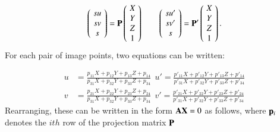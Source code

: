 \begin{equation}
\left(\!
    \begin{array}{c}
      su \\
      sv \\
      s
    \end{array}
  	\!\right) = \vect{P}
  	\left(\!
    \begin{array}{c}
      X \\
      Y \\
      Z \\
      1
    \end{array}
  	\!\right) 
  	\ \ \ \ \ \ \ \ 
\left(\!
    \begin{array}{c}
      su' \\
      sv' \\
      s
    \end{array}
  	\!\right) = \vect{P'}
  	\left(\!
    \begin{array}{c}
      X \\
      Y \\
      Z \\
      1
    \end{array}
  	\!\right).
\end{equation}
For each pair of image points, two equations can be written:

\begin{align*}
u &= \frac{p_{11}X + p_{12}Y + p_{13}Z + p_{14}}{p_{31}X + p_{32}Y + p_{33}Z + p_{34}} \ \  
u' = \frac{p'_{11}X + p'_{12}Y + p'_{13}Z + p'_{14}}{p'_{31}X + p'_{32}Y + p'_{33}Z + p'_{34}}\\ 
v &= \frac{p_{21}X + p_{22}Y + p_{23}Z + p_{24}}{p_{31}X + p_{32}Y + p_{33}Z + p_{34}} \ \ 
v' = \frac{p'_{21}X + p'_{22}Y + p'_{23}Z + p'_{24}}{p'_{31}X + p'_{32}Y + p'_{33}Z + p'_{34}}
\end{align*}
Rearranging, these can be written in the form $\mathbf{AX} = 0$ as follows, where $\mathbf{p}_i$ denotes the $ith$ row of the projection matrix $\mathbf{P}$

